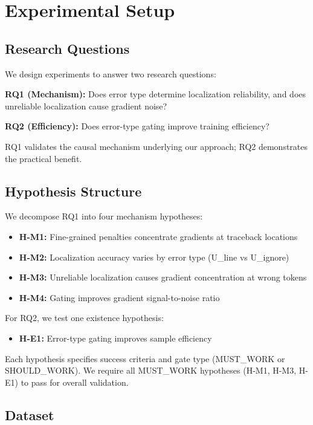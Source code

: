 \section{Experimental Setup}

\subsection{Research Questions}

We design experiments to answer two research questions:

\textbf{RQ1 (Mechanism):} Does error type determine localization reliability, and does unreliable localization cause gradient noise?

\textbf{RQ2 (Efficiency):} Does error-type gating improve training efficiency?

RQ1 validates the causal mechanism underlying our approach; RQ2 demonstrates the practical benefit.

\subsection{Hypothesis Structure}

We decompose RQ1 into four mechanism hypotheses:

\begin{itemize}
\item \textbf{H-M1:} Fine-grained penalties concentrate gradients at traceback locations
\item \textbf{H-M2:} Localization accuracy varies by error type (U\_line vs U\_ignore)
\item \textbf{H-M3:} Unreliable localization causes gradient concentration at wrong tokens
\item \textbf{H-M4:} Gating improves gradient signal-to-noise ratio
\end{itemize}

For RQ2, we test one existence hypothesis:

\begin{itemize}
\item \textbf{H-E1:} Error-type gating improves sample efficiency
\end{itemize}

Each hypothesis specifies success criteria and gate type (MUST\_WORK or SHOULD\_WORK). We require all MUST\_WORK hypotheses (H-M1, H-M3, H-E1) to pass for overall validation.

\subsection{Dataset}

